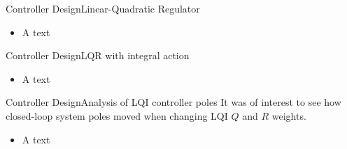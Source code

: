 \begin{frame}{Controller Design}{Linear-Quadratic Regulator}
	\begin{itemize}
		\item A text
	\end{itemize}
\end{frame}


\begin{frame}{Controller Design}{LQR with integral action}
	\begin{itemize}
		\item A text
	\end{itemize}\bigskip
\end{frame}



\begin{frame}{Controller Design}{Analysis of LQI controller poles}
	It was of interest to see how closed-loop system poles moved when changing LQI $ Q $ and $ R $ weights.
	\begin{itemize}
		\item A text
	\end{itemize}\bigskip
\end{frame}